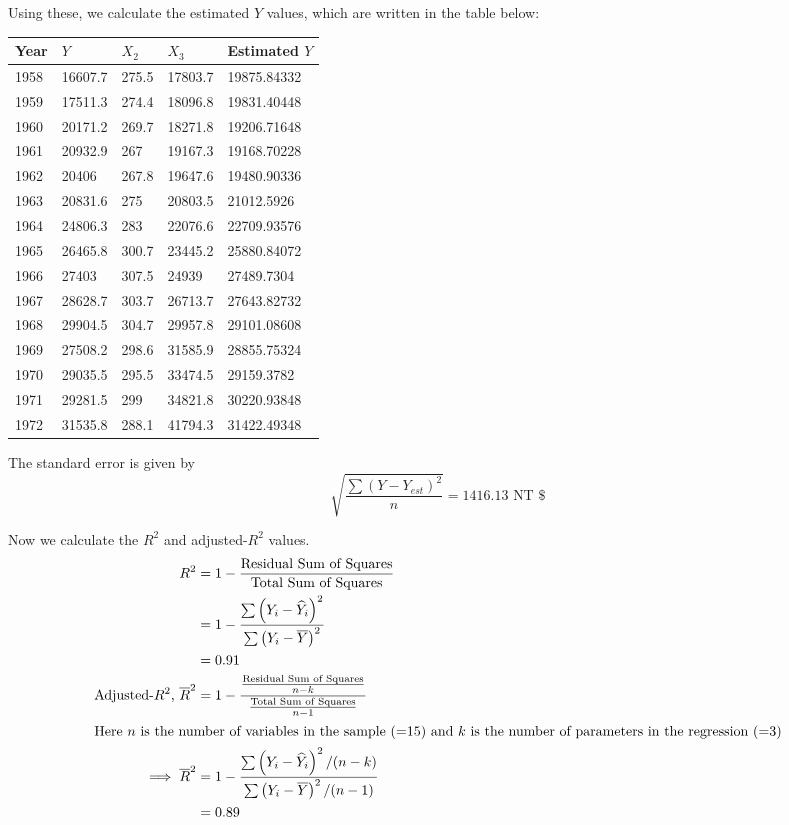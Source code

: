 \documentclass[12pt, oneside]{article}
\begin{document}
\begin{enumerate}
{    Using these, we calculate the estimated \(Y\) values, which are written in the table below:
    \begin{center}
    \begin{tabularx}{0.8\linewidth}{|X|X|X|X|X|}
        \hline
        Year & \(Y\)   & \(X_2\) & \(X_3\) & Estimated \(Y\) \\
        \hline
        1958 & 16607.7 & 275.5 & 17803.7 & 19875.84332 \\
        1959 & 17511.3 & 274.4 & 18096.8 & 19831.40448 \\
        1960 & 20171.2 & 269.7 & 18271.8 & 19206.71648 \\
        1961 & 20932.9 & 267   & 19167.3 & 19168.70228 \\
        1962 & 20406   & 267.8 & 19647.6 & 19480.90336 \\
        1963 & 20831.6 & 275   & 20803.5 & 21012.5926  \\
        1964 & 24806.3 & 283   & 22076.6 & 22709.93576 \\
        1965 & 26465.8 & 300.7 & 23445.2 & 25880.84072 \\
        1966 & 27403   & 307.5 & 24939   & 27489.7304  \\
        1967 & 28628.7 & 303.7 & 26713.7 & 27643.82732 \\
        1968 & 29904.5 & 304.7 & 29957.8 & 29101.08608 \\
        1969 & 27508.2 & 298.6 & 31585.9 & 28855.75324 \\
        1970 & 29035.5 & 295.5 & 33474.5 & 29159.3782  \\
        1971 & 29281.5 & 299   & 34821.8 & 30220.93848 \\
        1972 & 31535.8 & 288.1 & 41794.3 & 31422.49348 \\
        \hline
    \end{tabularx}
    \end{center}

    The standard error is given by
    \[\sqrt{\frac{\sum(Y - Y_{est})^2}{n}} = 1416.13 \text{ NT \$}\]

    Now we calculate the \(R^2\) and adjusted-\(R^2\) values.
    \begin{align*}
        R^2 &= 1 - \frac{\text{Residual Sum of Squares}}{\text{Total Sum of Squares}} \\
            &= 1 - \frac{\sum \left( Y_i - \widehat{Y}_i \right)^2}{\sum \left( Y_i - \overline{Y} \right)^2} \\
            &= 0.91 \\
        \text{Adjusted-\(R^2\), } \overline{R}^2 &= 1 - \frac{\frac{\text{Residual Sum of Squares}}{n - k}}{\frac{\text{Total Sum of Squares}}{n - 1}} \\
        \intertext{Here \(n\) is the number of variables in the sample (=15) and \(k\) is the number of parameters in the regression (=3)}
        \implies  \overline{R}^2 &= 1 - \frac{\sum \left( Y_i - \widehat{Y}_i \right)^2 / (n - k)}{\sum \left( Y_i - \overline{Y} \right)^2 / (n - 1)} \\
            &= 0.89
    \end{align*}

}
\end{enumerate}
\end{document}
